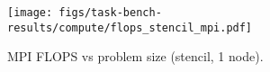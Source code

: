 \begin{figure}[t]
\centering
\texttt{[image: figs/task-bench-results/compute/flops\_stencil\_mpi.pdf]}
\vspace{-0.5cm}
\caption{MPI FLOPS vs problem size (stencil, 1 node).\label{fig:flops-mpi}}
\vspace{-0.05cm}
\end{figure}
